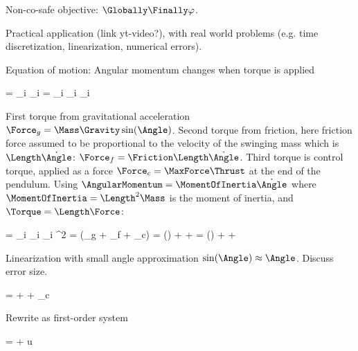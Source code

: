 Non-co-safe objective: $\Globally \Finally \varphi$.

Practical application (link yt-video?), with real world problems (e.g. time discretization, linearization, numerical errors).

\startsubsection[title={Derivation}]

    Equation of motion: Angular momentum changes when torque is applied

    \startformula
        \dot\AngularMomentum = \sum_{i} \Torque_i = \sum_{i} \Length_i \Force_i
    \stopformula

    First torque from gravitational acceleration $ \Force_g = \Mass \Gravity \sin(\Angle) $.
    Second torque from friction, here friction force assumed to be proportional to the velocity of the swinging mass which is $\Length \dot\Angle$: $\Force_f = \Friction \Length \dot\Angle$.
    Third torque is control torque, applied as a force $\Force_c = \MaxForce \Thrust$ at the end of the pendulum.
    Using $\AngularMomentum = \MomentOfInertia \dot\Angle$ where $\MomentOfInertia = \Length^2 \Mass$ is the moment of inertia, and $\Torque = \Length \Force$:

    \startformula
        \startalign[n=3,align={middle,right,left}]
            \NC
            \NC \dot\AngularMomentum =
            \NC \sum_{i} \Length_i \Force_i
            \NR
            \NC \Leftrightarrow \quad
            \NC \Length^2 \Mass \ddot\Angle =
            \NC \Length (\Force_g + \Force_f + \Force_c)
            \NR
            \NC \Leftrightarrow \quad
            \NC \Length \Mass \ddot\Angle =
            \NC \Mass \Gravity \sin(\Angle) + \Friction \Length \dot\Angle + \MaxForce \Thrust
            \NR
            \NC \Leftrightarrow \quad
            \NC \ddot\Angle =
            \NC \frac{\Gravity}{\Length} \sin(\Angle) + \frac{\Friction}{\Mass} \dot\Angle + \frac{\MaxForce}{\Length \Mass} \Thrust
            \NR
        \stopalign
    \stopformula

    Linearization with small angle approximation $\sin(\Angle) \approx \Angle$.
    Discuss error size.

    \startformula
        \ddot\Angle = \frac{\Gravity}{\Length} \Angle + \frac{\Friction}{\Mass} \dot\Angle +  \Force_c
    \stopformula

    Rewrite as first-order system

    \startformula
        \DDt \TwoByOne{\Angle}{\dot\Angle}
        =  \TwoByOne{\Angle}{\dot\Angle}
        +  u
    \stopformula

